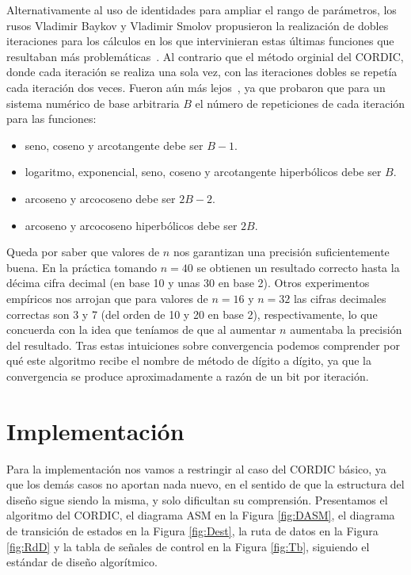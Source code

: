 \documentclass[12pt, a4paper]{article}
\begin{document}
Alternativamente al uso de identidades para ampliar el rango de parámetros, los rusos Vladimir Baykov y Vladimir Smolov propusieron la realización de dobles iteraciones para los cálculos en los que intervinieran estas últimas funciones que resultaban más problemáticas~\cite{baykov1}. Al contrario que el método orginial del CORDIC, donde cada iteración se realiza una sola vez, con las iteraciones dobles se repetía cada iteración dos veces. Fueron aún más lejos~\cite{baykov2}, ya que probaron que para un sistema numérico de base arbitraria $B$ el número de repeticiones de cada iteración para las funciones:
\begin{itemize}
    \item seno, coseno y arcotangente debe ser $B-1$.
    \item logaritmo, exponencial, seno, coseno y arcotangente hiperbólicos debe ser $B$.
    \item arcoseno y arcocoseno debe ser $2B-2$.
    \item arcoseno y arcocoseno hiperbólicos debe ser $2B$.
\end{itemize}

Queda por saber que valores de $n$ nos garantizan una precisión suficientemente buena. En la práctica tomando $n=40$ se obtienen un resultado correcto hasta la décima cifra decimal (en base 10 y unas 30 en base 2). Otros experimentos empíricos \cite{tesis} nos arrojan que para valores de $n=16$ y $n=32$ las cifras decimales correctas son 3 y 7 (del orden de 10 y 20 en base 2), respectivamente, lo que concuerda con la idea que teníamos de que al aumentar $n$ aumentaba la precisión del resultado. Tras estas intuiciones sobre convergencia podemos comprender por qué este algoritmo recibe el nombre de método de dígito a dígito, ya que la convergencia se produce aproximadamente a razón de un bit por iteración.
\section{Implementación}
Para la implementación nos vamos a restringir al caso del CORDIC básico, ya que los demás casos no aportan nada nuevo, en el sentido de que la estructura del diseño sigue siendo la misma, y solo dificultan su comprensión. Presentamos el algoritmo del CORDIC, el diagrama ASM en la Figura \ref{fig:DASM}, el diagrama de transición de estados en la Figura \ref{fig:Dest}, la ruta de datos en la Figura \ref{fig:RdD} y la tabla de señales de control en la Figura \ref{fig:Tb}, siguiendo el estándar de diseño algorítmico.
\end{document}
